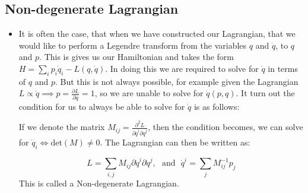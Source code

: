 \documentclass[11pt]{article}
\numberwithin{equation}{section}
\begin{document}
\subsection{Non-degenerate Lagrangian}{\label{Non-degenerate Lagrangian}}
\begin{itemize}
  \item It is often the case, that when we have constructed our Lagrangian, that we would like to perform a Legendre transform from the variables $q$ and $\dot{q}$, to $q$ and $p$. This is gives us our Hamiltonian and takes the form $H =\sum_i p_i \dot{q}_i  - L(q,\dot{q})$. In doing this we are required to solve for $\dot{q}$ in terms of $q$ and $p$. But this is not always possible, for example given the Lagrangian $L \propto \dot{q} \implies p = \frac{\partial L}{\partial q} = 1$, so we are unable to solve for $\dot{q}(p,q)$. It turn out the condition for us to always be able to solve for $\dot{q}$ is as follows:

  If we denote the matrix $M_{ij} = \frac{\partial^2 L}{\partial\dot{q}^i\partial\dot{q}^j}$, then the condition becomes, we can solve for $\dot{q}_{i} \iff \text{det}(M) \neq 0$. The Lagrangian can then be written as:

  \begin{equation*}
  L = \sum_{i,j}M_{ij}\partial\dot{q}^i\partial\dot{q}^j, ~~~ \text{and}~~~ \dot{q}^i  = \sum_{j}M^{-1}_{ij}p_j
  \end{equation*}
  This is called a Non-degenerate Lagrangian. 
\end{itemize}
\end{document}
